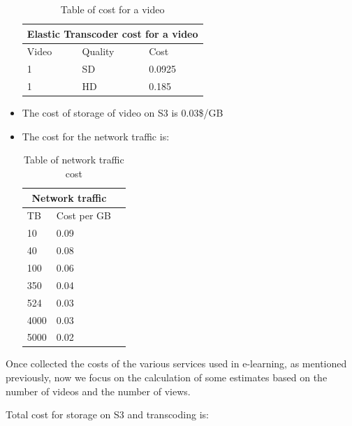 \begin{itemize}
\begin{table}[h!]
\centering
\begin{tabular}{ |p{3cm}|p{3cm}|p{3cm}|  }
  \hline
  \multicolumn{3}{|c|}{Elastic Transcoder cost for a video} \\
  \hline
  Video & Quality & Cost \\
  \hline
  1 & SD & 0.0925 \\
  1 & HD & 0.185 \\
  \hline
\end{tabular}
\caption{Table of cost for a video}
\label{table:1}
\end{table}


\item The cost of storage of video on S3 is 0.03\$/GB
\item The cost for the network traffic is:


\begin{table}[h!]
\centering
\begin{tabular}{ |p{3cm}|p{3cm}|p{3cm}|  }
  \hline
  \multicolumn{2}{|c|}{Network traffic} \\
  \hline
  TB & Cost per GB \\
  \hline
  10 & 0.09 \\
  40 & 0.08 \\
  100 & 0.06 \\
  350 & 0.04 \\
  524 & 0.03 \\
  4000 & 0.03 \\
  5000 & 0.02 \\
  \hline
\end{tabular}
\caption{Table of network traffic cost}
\label{table:1}
\end{table}


\end{itemize}

Once collected the costs of the various services used in e-learning, as mentioned previously, now we focus on the calculation of some estimates based on the number of videos and the number of views.

Total cost for storage on S3 and transcoding is:


